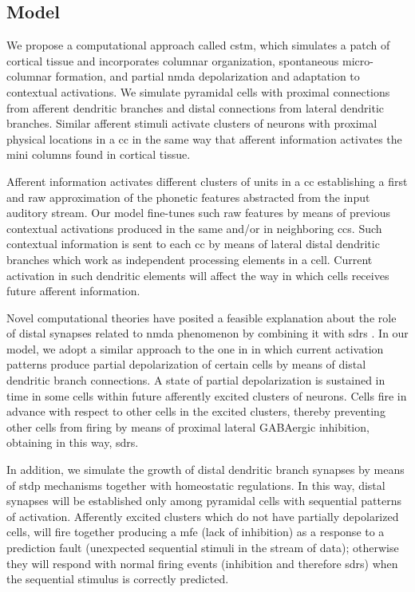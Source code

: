 \documentclass[10pt,letterpaper]{article}
\begin{document}
\subsection*{Model}
We propose a computational approach called \gls{cstm}, which simulates a patch of cortical tissue and incorporates columnar organization, spontaneous micro-columnar formation, and partial \gls{nmda} depolarization and adaptation to contextual activations. We simulate pyramidal cells with proximal connections from afferent dendritic branches and distal connections from lateral dendritic branches. Similar afferent stimuli activate clusters of neurons with proximal physical locations in a \gls{cc} in the same way that afferent information activates the mini columns found in cortical tissue.

Afferent information activates different clusters of units in a \gls{cc} establishing a first and raw approximation of the phonetic features abstracted from the input auditory stream. Our model fine-tunes such raw features by means of previous contextual activations produced in the same and/or in neighboring \glspl{cc}. Such contextual information is sent to each \gls{cc} by means of lateral distal dendritic branches which work as independent processing elements in a cell. Current activation in such dendritic elements will affect the way in which cells receives future afferent information.

Novel computational theories have posited a feasible explanation about the role of distal synapses related to \gls{nmda}
phenomenon \cite{hawkins_2016} by combining it with \glspl{sdr} \cite{ahmad_2016}. In our model, we adopt a similar approach to the one in \cite{hawkins_2016} in which current activation patterns produce partial depolarization of certain cells by means of distal dendritic branch connections. A state of partial depolarization is sustained in time in some cells within
future afferently excited clusters of neurons. Cells fire in advance with respect to other cells in the excited clusters, thereby preventing other cells from firing by means of proximal lateral GABAergic inhibition, obtaining in this way, \glspl{sdr}.

In addition, we simulate the growth of distal dendritic branch synapses by means of \gls{stdp} mechanisms together with
homeostatic regulations. In this way, distal synapses will be established only among pyramidal cells with sequential patterns
of activation. Afferently excited clusters which do not have partially depolarized cells,
will fire together producing a \gls{mfe}
(lack of inhibition) as a response to a prediction fault (unexpected sequential stimuli in the stream of data); otherwise they will respond with normal firing events (inhibition and therefore \glspl{sdr}) when the sequential stimulus is
correctly predicted.
\end{document}
